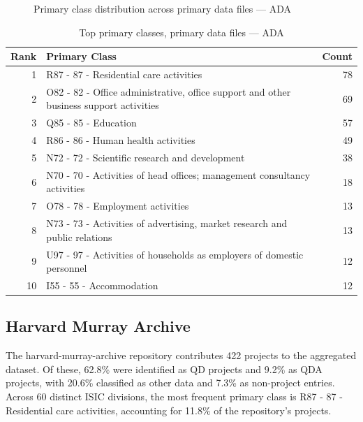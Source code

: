 \clearpage

\begin{figure}[H]
    \centering
    
    \caption{Primary class distribution across primary data files --- ADA}
\end{figure}

\begin{table}[H]
    \centering
    \begin{tabular}{r p{10cm} r}
    \hline
    \textbf{Rank} & \textbf{Primary Class} & \textbf{Count} \\
    \hline
    1 & R87 - 87 - Residential care activities & 78 \\
    2 & O82 - 82 - Office administrative, office support and other business support activities & 69 \\
    3 & Q85 - 85 - Education & 57 \\
    4 & R86 - 86 - Human health activities & 49 \\
    5 & N72 - 72 - Scientific research and development & 38 \\
    6 & N70 - 70 - Activities of head offices; management consultancy activities & 18 \\
    7 & O78 - 78 - Employment activities & 13 \\
    8 & N73 - 73 - Activities of advertising, market research and public relations & 13 \\
    9 & U97 - 97 - Activities of households as employers of domestic personnel & 12 \\
    10 & I55 - 55 - Accommodation & 12 \\
    \hline
    \end{tabular}
    \caption{Top primary classes, primary data files --- ADA}
\end{table}

\clearpage

\subsection{Harvard Murray Archive}


The harvard-murray-archive repository contributes 422 projects to the aggregated dataset. Of these, 62.8\% were identified as QD projects and 9.2\% as QDA projects, with 20.6\% classified as other data and 7.3\% as non-project entries. Across 60 distinct ISIC divisions, the most frequent primary class is R87 - 87 - Residential care activities, accounting for 11.8\% of the repository's projects.


